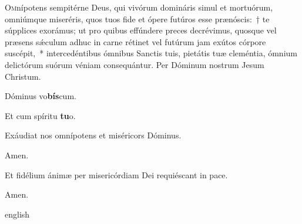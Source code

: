{\lettrine{O}{m}nípotens sempitérne Deus, qui vivórum domináris simul et mortuórum, omniúmque miseréris, quos tuos fide et ópere futúros esse prænóscis:~† te súpplices exorámus; ut pro quibus effúndere preces decrévimus, quosque vel præsens sǽculum adhuc in carne rétinet vel futúrum jam exútos córpore suscépit,~* intercedéntibus ómnibus San\-ctis tuis, pietátis tuæ cleméntia, ómnium deli\-ctórum suórum véniam consequántur. Per Dóminum nostrum Jesum Christum.

\vv Dóminus vo\textbf{bís}cum.

\rr Et cum spíritu \textbf{tu}o.


\vv Exáudiat nos omnípotens et miséricors Dóminus.

\rr Amen.


\vv Et fidélium ánimæ per misericórdiam Dei requiéscant in pace.

\rr Amen.}
{english}
